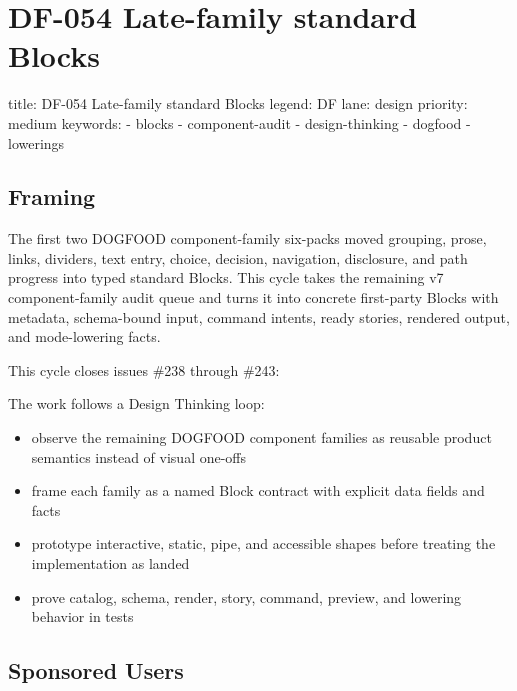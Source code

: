 \chapter{DF-054 Late-family standard Blocks}\label{record-099}

\smallskip

\begin{RecordMeta}
title: DF-054 Late-family standard Blocks
legend: DF
lane: design
priority: medium
keywords:
  - blocks
  - component-audit
  - design-thinking
  - dogfood
  - lowerings

\end{RecordMeta}

\section{Framing}\label{record-099-framing}

The first two DOGFOOD component-family six-packs moved grouping, prose, links, dividers, text entry, choice, decision, navigation, disclosure, and path progress into typed standard Blocks. This cycle takes the remaining v7 component-family audit queue and turns it into concrete first-party Blocks with metadata, schema-bound input, command intents, ready stories, rendered output, and mode-lowering facts.

This cycle closes issues \#238 through \#243:



The work follows a Design Thinking loop:

\begin{itemize}
\tightlist
\item
  observe the remaining DOGFOOD component families as reusable product semantics instead of visual one-offs
\item
  frame each family as a named Block contract with explicit data fields and facts
\item
  prototype interactive, static, pipe, and accessible shapes before treating the implementation as landed
\item
  prove catalog, schema, render, story, command, preview, and lowering behavior in tests
\end{itemize}

\section{Sponsored Users}\label{record-099-sponsored-users}

